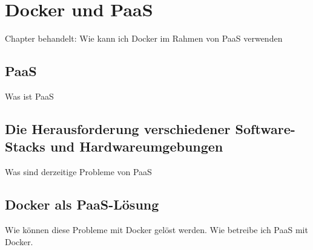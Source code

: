 \chapter{Docker und PaaS}
\label{cha:docker_und_paas}
Chapter behandelt: Wie kann ich Docker im Rahmen von PaaS verwenden

\section{PaaS}
\label{sec:paas}
Was ist PaaS

\section{Die Herausforderung verschiedener Software-Stacks und Hardwareumgebungen}
\label{sec:matrix_of_hell}
Was sind derzeitige Probleme von PaaS

\section{Docker als PaaS-Lösung}
\label{sec:docker_als_paasLösung}
Wie können diese Probleme mit Docker gelöst werden. Wie betreibe ich PaaS mit Docker.